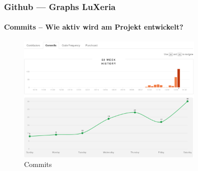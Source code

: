 \begin{frame}
	\frametitle{Github --- Graphs \hfill{} LuXeria}
	\framesubtitle{Commits -- Wie aktiv wird am Projekt entwickelt? }
	\begin{figure}
		\includegraphics[width=0.8\textwidth]{github_commits.pdf}
		\caption{Commits}
	\end{figure}
\end{frame}

